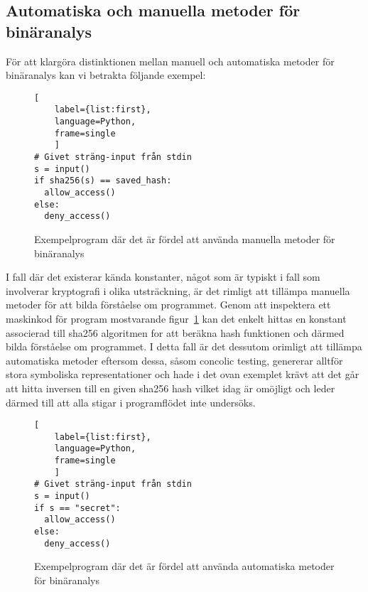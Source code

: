 
\subsection{Automatiska och manuella metoder för binäranalys}
För att klargöra distinktionen mellan manuell och automatiska metoder för
binäranalys kan vi betrakta följande exempel:

\begin{figure}
    \begin{lstlisting}[
    label={list:first},
    language=Python,
    frame=single
    ]
# Givet sträng-input från stdin
s = input()
if sha256(s) == saved_hash:
  allow_access()
else:
  deny_access()
\end{lstlisting}
    \caption{Exempelprogram där det är fördel att använda manuella metoder för binäranalys}
    \label{fig:manual_method_example}
\end{figure}

I fall där det existerar kända konstanter, något som är typiskt i fall som
involverar kryptografi i olika utsträckning, är det rimligt att tillämpa
manuella metoder för att bilda förståelse om programmet. Genom att inspektera
ett maskinkod för program mostvarande figur~\ref{fig:manual_method_example} kan
det enkelt hittas en konstant associerad till sha256 algoritmen for att beräkna
hash funktionen och därmed bilda förståelse om programmet. I detta fall är det
dessutom orimligt att tillämpa automatiska metoder eftersom dessa, såsom
concolic testing, genererar alltför stora symboliska representationer och hade
i det ovan exemplet krävt att det går att hitta inversen till en given sha256
hash vilket idag är omöjligt och leder därmed till att alla stigar i
programflödet inte undersöks.

\begin{figure}
    \begin{lstlisting}[
    label={list:first},
    language=Python,
    frame=single
    ]
# Givet sträng-input från stdin
s = input()
if s == "secret":
  allow_access()
else:
  deny_access()
\end{lstlisting}
    \caption{Exempelprogram där det är fördel att använda automatiska metoder för binäranalys}
    \label{fig:automatic_method_example}
\end{figure}


